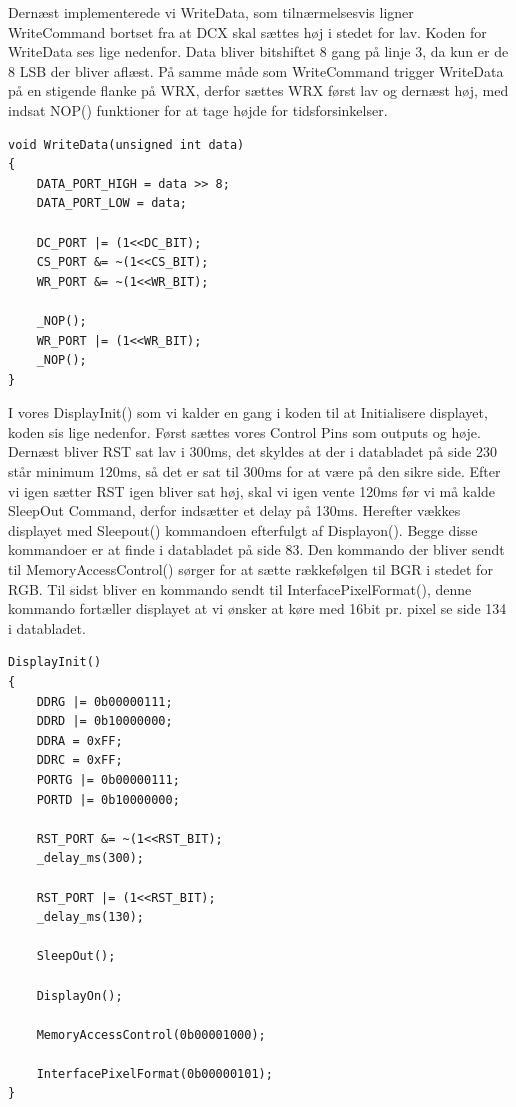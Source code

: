 Dernæst implementerede vi WriteData, som tilnærmelsesvis ligner WriteCommand bortset fra at DCX skal sættes høj i stedet for lav. Koden for WriteData ses lige nedenfor. Data bliver bitshiftet 8 gang på linje 3, da kun er de 8 LSB der bliver aflæst. På samme måde som WriteCommand trigger WriteData på en stigende flanke på WRX, derfor sættes WRX først lav og dernæst høj, med indsat NOP() funktioner for at tage højde for tidsforsinkelser. 

\begin{lstlisting}
void WriteData(unsigned int data)
{
	DATA_PORT_HIGH = data >> 8;
	DATA_PORT_LOW = data;

	DC_PORT |= (1<<DC_BIT);
	CS_PORT &= ~(1<<CS_BIT);
	WR_PORT &= ~(1<<WR_BIT);

	_NOP();
	WR_PORT |= (1<<WR_BIT);
	_NOP();
}
\end{lstlisting}


I vores DisplayInit() som vi kalder en gang i koden til at Initialisere displayet, koden sis lige nedenfor. Først sættes vores Control Pins som outputs og høje. Dernæst bliver RST sat lav i 300ms, det skyldes at der i databladet\cite{man:ILI9341} på side 230 står minimum 120ms, så det er sat til 300ms for at være på den sikre side. Efter vi igen sætter RST igen bliver sat høj, skal vi igen vente 120ms før vi må kalde SleepOut Command, derfor indsætter et delay på 130ms. Herefter vækkes displayet med Sleepout() kommandoen efterfulgt af Displayon(). Begge disse kommandoer er at finde i databladet\cite{man:ILI9341} på side 83. Den kommando der bliver sendt til MemoryAccessControl() sørger for at sætte rækkefølgen til BGR i stedet for RGB. Til sidst bliver en kommando sendt til InterfacePixelFormat(), denne kommando fortæller displayet at vi ønsker at køre med 16bit pr. pixel se side 134 i databladet\cite{man:ILI9341}. 


\begin{lstlisting}
DisplayInit()
{
	DDRG |= 0b00000111;
	DDRD |= 0b10000000;
	DDRA = 0xFF;
	DDRC = 0xFF;
	PORTG |= 0b00000111;
	PORTD |= 0b10000000;
	
	RST_PORT &= ~(1<<RST_BIT);
	_delay_ms(300);

	RST_PORT |= (1<<RST_BIT);
	_delay_ms(130);
	
	SleepOut();

	DisplayOn();

	MemoryAccessControl(0b00001000);
	
	InterfacePixelFormat(0b00000101);
}
\end{lstlisting}


